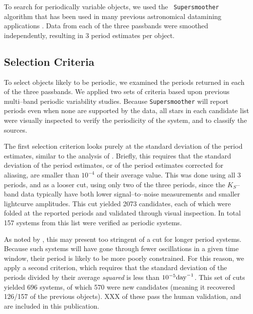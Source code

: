 \documentclass[]{emulateapj}
\begin{document}
To search for periodically variable objects, we used the {\tt
  Supersmoother} algorithm that has been used in many previous
astronomical datamining applications
\citep[e.g.][]{2011ApJ...731...17B}.  Data from each of the three
passbands were smoothed independently, resulting in 3 period estimates
per object.


\subsection{Selection Criteria}
To select objects likely to be periodic, we examined the periods
returned in each of the three passbands.  We applied two sets of
criteria based upon previous multi--band periodic variability
studies.  Because {\tt Supersmoother} will report periods even when
none are supported by the data, all stars in each candidate list were
visually inspected to verify the periodicity of the system, and to
classify the sources.

The first selection criterion looks purely at the standard deviation
of the period estimates, similar to the analysis of
\cite{2011ApJ...731...17B}.  Briefly, this requires that the standard
deviation of the period estimates, or of the period estimates
corrected for aliasing, are smaller than $10^{-4}$ of their average
value. This was done using all 3 periods, and as a looser cut, using
only two of the three periods, since the $K_S$--band data typically
have both lower signal--to--noise measurements and smaller lightcurve
amplitudes.  This cut yielded 2073 candidates, each of which were
folded at the reported periods and validated through visual
inspection.  In total 157 systems from this list were verified as
periodic systems.

As noted by \cite{2012AJ....144....9O}, this may present too stringent
of a cut for longer period systems.  Because such systems will have
gone through fewer oscillations in a given time window, their period
is likely to be more poorly constrained.  For this reason, we apply a
second criterion, which requires that the standard deviation of the
periods divided by their average {\it squared} is less than $10^{-5}
{\rm day}^{-1}$.  This set of cuts yielded 696 systems, of which 570
were new candidates (meaning it recovered 126/157 of the previous
objects).  XXX of these pass the human validation, and are included in
this publication.
\end{document}
